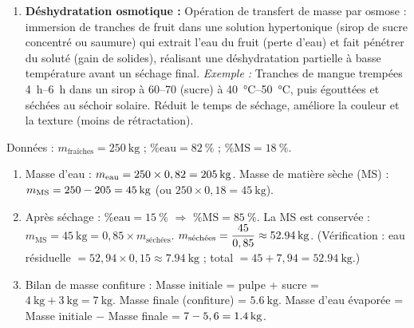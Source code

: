 \documentclass[11pt]{article}
\newcounter{popsec}
\newcounter{popsub}
\newcommand{\courssub}[1]{%
  \stepcounter{popsub}%
  \par\vspace{9pt}\noindent{\popxbold\fontsize{11.5}{13}\selectfont\color{popink}{\color{poporange}\thepopsec.\thepopsub}\hspace{6pt}#1}\par\nopagebreak\vspace{4pt}
}
\begin{document}
\begin{corrige}
\begin{enumerate}
\item \textbf{Déshydratation osmotique :} Opération de transfert de masse par osmose : immersion de tranches de fruit dans une solution hypertonique (sirop de sucre concentré ou saumure) qui extrait l'eau du fruit (perte d'eau) et fait pénétrer du soluté (gain de solides), réalisant une déshydratation partielle à basse température avant un séchage final.
\emph{Exemple :} Tranches de mangue trempées \SI{4}{\hour}--\SI{6}{\hour} dans un sirop à \SI{60}{\degreeBrix}--\SI{70}{\degreeBrix} (sucre) à \SI{40}{\degreeCelsius}--\SI{50}{\degreeCelsius}, puis égouttées et séchées au séchoir solaire. Réduit le temps de séchage, améliore la couleur et la texture (moins de rétractation).
\end{enumerate}
\end{corrige}

\begin{corrige}
Données : $m_{\text{fraîches}} = \SI{250}{\kg}$ ; $\% \text{eau} = \SI{82}{\%}$ ; $\% \text{MS} = \SI{18}{\%}$.
\begin{enumerate}
\item Masse d'eau : $m_{\text{eau}} = 250 \times 0,82 = \textbf{\SI{205}{\kg}}$.
Masse de matière sèche (MS) : $m_{\text{MS}} = 250 - 205 = \textbf{\SI{45}{\kg}}$ (ou $250 \times 0,18 = \SI{45}{\kg}$).

\item Après séchage : $\% \text{eau} = \SI{15}{\%}$ $\Rightarrow$ $\% \text{MS} = \SI{85}{\%}$.
La MS est conservée : $m_{\text{MS}} = \SI{45}{\kg} = 0,85 \times m_{\text{séchées}}$.
$m_{\text{séchées}} = \dfrac{45}{0,85} \approx \textbf{\SI{52,94}{\kg}}$.
(Vérification : eau résiduelle $= 52,94 \times 0,15 \approx \SI{7,94}{\kg}$ ; total $= 45 + 7,94 = \SI{52,94}{\kg}$.)

\item Bilan de masse confiture :
Masse initiale = pulpe + sucre = $\SI{4}{\kg} + \SI{3}{\kg} = \SI{7}{\kg}$.
Masse finale (confiture) = $\SI{5,6}{\kg}$.
Masse d'eau évaporée = Masse initiale $-$ Masse finale = $7 - 5,6 = \textbf{\SI{1,4}{\kg}}$.
\end{enumerate}
\end{corrige}

\courssub{Je m'entraîne}
\end{document}
